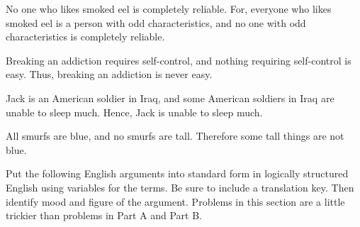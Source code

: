 \begin{exercises}
\item  No one who likes smoked eel is completely reliable. For, everyone who likes smoked eel is a person with odd characteristics, and no one with odd characteristics is completely reliable.

\item Breaking an addiction requires self-control, and nothing requiring self-control is easy. Thus, breaking an addiction is never easy.

\item Jack is an American soldier in Iraq, and some American soldiers in Iraq are unable to sleep much. Hence, Jack is unable to sleep much.

\item All smurfs are blue, and no smurfs are tall. Therefore some tall things are not blue.



\end{exercises}

 \noindent\problempart Put the following English arguments into standard form in logically structured English using variables for the terms. Be sure to include a translation key. Then identify mood and figure of the argument. Problems in this section are a little trickier than problems in Part A and Part B.


